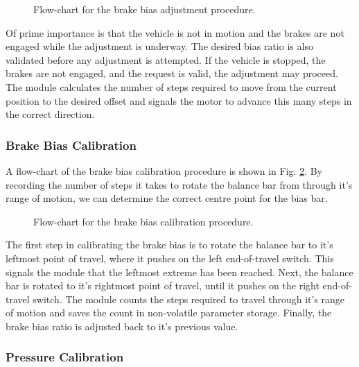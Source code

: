 \vspace{0.5em}
\begin{figure}[H]
	\centering
	
	\caption{Flow-chart for the brake bias adjustment procedure.}
	\label{fig:design-braking-bias-adjustment}
\end{figure}

Of prime importance is that the vehicle is not in motion and the brakes are not engaged while the adjustment is underway. The desired bias ratio is also validated before any adjustment is attempted. If the vehicle is stopped, the brakes are not engaged, and the request is valid, the adjustment may proceed. The module calculates the number of steps required to move from the current position to the desired offset and signals the motor to advance this many steps in the correct direction.

\subsubsection{Brake Bias Calibration}

A flow-chart of the brake bias calibration procedure is shown in Fig. \ref{fig:brake_bias_calibration_flow}. By recording the number of steps it takes to rotate the balance bar from through it's range of motion, we can determine the correct centre point for the bias bar. 

\vspace{0.5em}
\begin{figure}[H]
	\centering
	
	\caption{Flow-chart for the brake bias calibration procedure.}
	\label{fig:brake_bias_calibration_flow}
\end{figure}

The first step in calibrating the brake bias is to rotate the balance bar to it's leftmost point of travel, where it pushes on the left end-of-travel switch. This signals the module that the leftmost extreme has been reached. Next, the balance bar is rotated to it's rightmost point of travel, until it pushes on the right end-of-travel switch. The module counts the steps required to travel through it's range of motion and saves the count in non-volatile parameter storage. Finally, the brake bias ratio is adjusted back to it's previous value.

\subsubsection{Pressure Calibration}

